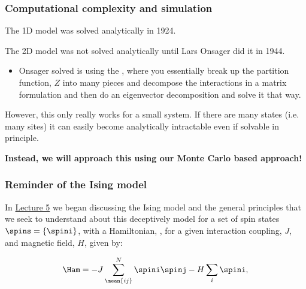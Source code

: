 \documentclass[hyperref={colorlinks=true}]{beamer}
\begin{document}
\begin{frame}%
  \frametitle{Computational complexity and simulation}
  
  The 1D model was solved analytically in 1924. 
  
  \vspace{0.3cm}
  
  The 2D model was not solved analytically until Lars Onsager did it in 1944. 
  \begin{itemize}
    \item Onsager solved is using the , where you essentially break up the partition function, $Z$ into many pieces and decompose the interactions in a matrix formulation and then do an eigenvector decomposition and solve it that way. 
  \end{itemize}
  
  \vspace{0.3cm}
  
  However, this only really works for a small system. If there are many states (i.e. many sites) it can easily become analytically intractable even if solvable in principle.
  
  \vspace{0.3cm}
  
  \begin{ucblock}{}
     \textbf{Instead, we will approach this using our Monte Carlo based approach!}
  \end{ucblock}
   
\end{frame}


\begin{frame}%
  \frametitle{Reminder of the Ising model}
  
  In \href{https://github.com/UChicagoPhysics/PHYS250/blob/master/Slides/Lecture5/PHYS250-Fall2019-Lecture5.pdf}{Lecture 5} we began discussing the Ising model and the general principles that we seek to understand about this deceptively  model for a set of spin states $\spins = \{\spini\}$, with a Hamiltonian, \Ham, for a given interaction coupling, $J$, and magnetic field, $H$, given by:
  
  \begin{equation}
    \Ham = -J \sum_{\mean{ij}}^N \spini \spinj - H \sum_i \spini , \label{eq:ising-field}
  \end{equation} 
  
  \begin{ucblock}{}
  \end{ucblock}
  
\end{frame}
\end{document}
